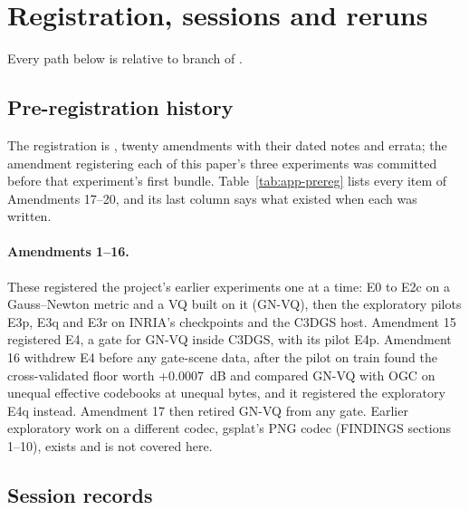 \section{Registration, sessions and reruns}
\label{sec:appendix}
\begingroup\sloppy

Every path below is relative to branch  of .

\subsection{Pre-registration history}
\label{sec:app-prereg}

The registration is , twenty amendments with their dated notes and errata; the amendment registering each of this paper's three experiments was committed before that experiment's first bundle. %
Table~\ref{tab:app-prereg} lists every item of Amendments 17--20, and its last column says what existed when each was written. %

\paragraph{Amendments 1--16.}
These registered the project's earlier experiments one at a time: E0 to E2c on a Gauss--Newton metric and a VQ built on it (GN-VQ), then the exploratory pilots E3p, E3q and E3r on INRIA's checkpoints and the C3DGS host. %
Amendment 15 registered E4, a gate for GN-VQ inside C3DGS, with its pilot E4p. %
Amendment 16 withdrew E4 before any gate-scene data, after the pilot on train found the cross-validated floor worth +0.0007~dB and compared GN-VQ with OGC on unequal effective codebooks at unequal bytes, and it registered the exploratory E4q instead. %
Amendment 17 then retired GN-VQ from any gate. %
Earlier exploratory work on a different codec, gsplat's PNG codec (FINDINGS sections 1--10), exists and is not covered here.



\subsection{Session records}
\label{sec:app-sessions}

